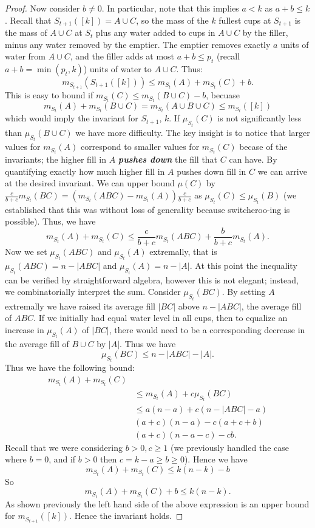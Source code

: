 \documentclass[twocolumn]{article}[11pt]
\newcommand{\defn}[1]{{\textit{\textbf{\boldmath #1}}}}
\begin{document}
\begin{proof}
Now consider $b\neq 0$. In particular, note that this implies $a < k$ as $a+b
\le k$. Recall that $S_{t+1}([k]) = A \cup C$, so the mass of the $k$ fullest
cups at $S_{t+1}$ is the mass of $A\cup C$ at $S_t$ plus any water added to
cups in $A\cup C$ by the filler, minus any water removed by the emptier. 
The emptier removes exactly $a$ units of water from $A\cup C$, and the filler
adds at most $a+b \le p_t$ (recall $a+b = \min(p_t, k)$) units of water to $A\cup C$.
Thus:
$$m_{S_{t+1}}(S_{t+1}([k])) \le m_{S_t}(A) + m_{S_t}(C) + b.$$
This is easy to bound if $m_{S_t}(C) \le m_{S_t}(B\cup C) - b$, becuase 
$$m_{S_t}(A) + m_{S_t}(B\cup C)  = m_{S_t}(A\cup B\cup C) \le m_{S_t}([k])$$
which would imply the invariant for $S_{t+1}$, $k$.
If $\mu_{S_t}(C)$ is not significantly less than $\mu_{S_t}(B\cup C)$ we have more difficulty.
The key insight is to notice that larger values for $m_{S_t}(A)$ correspond to
smaller values for $m_{S_t}(C)$ becase of the invariants; the higher fill in
$A$ \defn{pushes down} the fill that $C$ can have.
By quantifying exactly how much higher fill in $A$ pushes down fill in $C$ we
can arrive at the desired invariant.
We can upper bound $\mu(C)$ by $\frac{c}{b+c}m_{S_t}(BC) = (m_{S_t}(ABC) - m_{S_t}(A))\frac{c}{b+c}$ as
$\mu_{S_t}(C) \le \mu_{S_t}(B)$ (we established that this was without loss of
generality because switcheroo-ing is possible).
Thus, we have 
$$m_{S_t}(A) + m_{S_t}(C) \le \frac{c}{b+c}m_{S_t}(ABC) + \frac{b}{b+c}m_{S_t}(A).$$
Now we set $\mu_{S_t}(ABC)$ and $\mu_{S_t}(A)$ extremally, that is
$\mu_{S_t}(ABC) = n-|ABC|$ and $\mu_{S_t}(A) = n-|A|$.
At this point the inequality can be verified by straightforward algebra,
however this is not elegant; instead, we combinatorially interpret the sum.
Consider $\mu_{S_t}(BC)$. By setting $A$ extremally we have raised its average
fill $|BC|$ above $n-|ABC|$, the average fill of $ABC$. If we initially had
equal water level in all cups, then to equalize an increase in $\mu_{S_t}(A)$
of $|BC|$, there would need to be a corresponding decrease in the average fill
of $B\cup C$ by $|A|$.
Thus we have $$\mu_{S_t}(BC) \le n-|ABC|-|A|.$$
Thus we have the following bound:
\begin{align*}
  m_{S_t}(A) + m_{S_t}(C)&\\
&\le m_{S_t}(A) + c\mu_{S_t}(BC)\\
&\le a(n-a) + c(n-|ABC|-a)\\
&(a+c)(n-a) - c(a+c+b)\\
&(a+c)(n-a-c) - cb.
\end{align*}
Recall that we were considering $b> 0, c \ge 1$ (we previously handled the case
where $b=0$, and if $b>0$ then $c=k-a\ge b\ge 0$).
Hence we have 
$$m_{S_t}(A) + m_{S_t}(C) \le k(n-k) -b$$
So 
$$m_{S_t}(A) + m_{S_t}(C)+b \le k(n-k).$$
As shown previously the left hand side of the above expression is an upper bound for $m_{S_{t+1}}([k])$.
Hence the invariant holds.



\end{proof}
\end{document}
